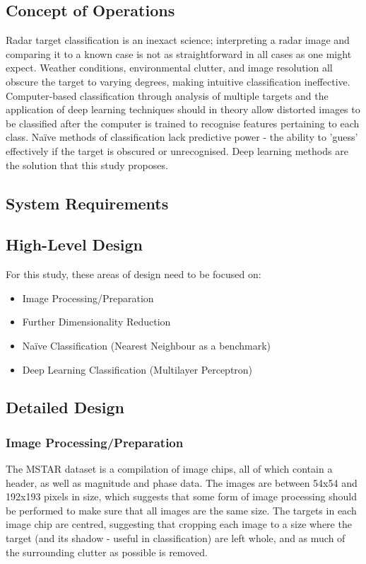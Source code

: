 \subsection{Concept of Operations}
Radar target classification is an inexact science; interpreting a radar image and comparing it to a known case is not as straightforward in all cases as one might expect. Weather conditions, environmental clutter, and image resolution all obscure the target to varying degrees, making intuitive classification ineffective. Computer-based classification through analysis of multiple targets and the application of deep learning techniques should in theory allow distorted images to be classified after the computer is trained to recognise features pertaining to each class. Na{\"i}ve methods of classification lack predictive power - the ability to 'guess' effectively if the target is obscured or unrecognised. Deep learning methods are the solution that this study proposes.

\subsection{System Requirements}
\subsection{High-Level Design}
For this study, these areas of design need to be focused on:
\begin{itemize}
	\item Image Processing/Preparation
	\item Further Dimensionality Reduction
	\item Na{\"i}ve Classification (Nearest Neighbour as a benchmark)
	\item Deep Learning Classification (Multilayer Perceptron)
\end{itemize}



\subsection{Detailed Design}
\subsubsection{Image Processing/Preparation}\label{sec:cropping}
The MSTAR dataset is a compilation of image chips, all of which contain a header, as well as magnitude and phase data. The images are between 54x54 and 192x193 pixels in size, which suggests that some form of image processing should be performed to make sure that all images are the same size. The targets in each image chip are centred, suggesting that cropping each image to a size where the target (and its shadow - useful in classification) are left whole, and as much of the surrounding clutter as possible is removed.

